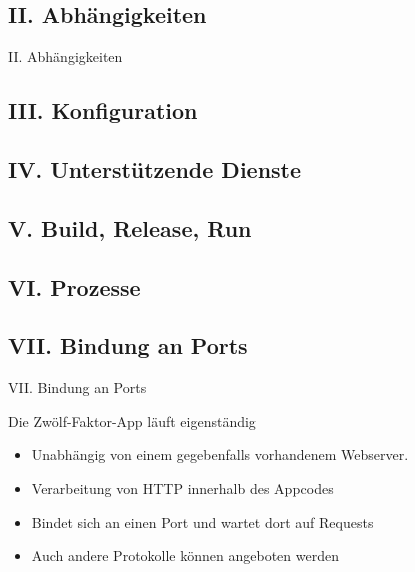 \documentclass{beamer}
\begin{document}
			\subsection{II. Abhängigkeiten}
				\begin{frame}{II. Abhängigkeiten}
					
				\end{frame}
			\subsection{III. Konfiguration}
			\subsection{IV. Unterstützende Dienste}
			\subsection{V. Build, Release, Run}
			\subsection{VI. Prozesse}
			\subsection{VII. Bindung an Ports}
				\begin{frame}{VII. Bindung an Ports}
					\begin{block}{Die Zwölf-Faktor-App läuft eigenständig}
						\begin{itemize}
							\item Unabhängig von einem gegebenfalls vorhandenem Webserver.
							\item Verarbeitung von HTTP innerhalb des Appcodes
							\item Bindet sich an einen Port und wartet dort auf Requests
							\item Auch andere Protokolle können angeboten werden
						\end{itemize}
					\end{block}
					

				\end{frame}
\end{document}
